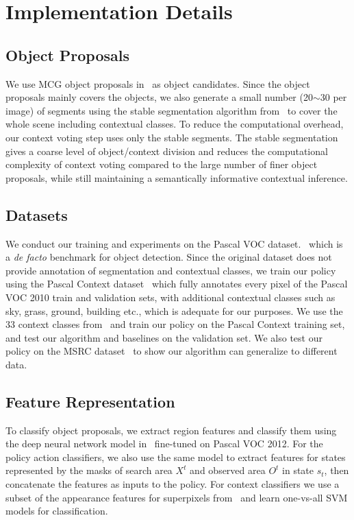 \section{Implementation Details}
\subsection{Object Proposals}
We use MCG object proposals in~\cite{arbelaez2014multiscale} as object candidates. Since the object proposals mainly covers the objects,  we also generate a small number (20$\sim$30 per image) of segments using the stable segmentation algorithm from~\cite{chen2011piecing} to cover the whole scene including contextual classes. To reduce the computational overhead, our context voting step uses only the stable segments. The stable segmentation gives a coarse level of object/context division and reduces the computational complexity of context voting compared to the large number of finer object proposals, while still maintaining a semantically informative contextual inference. 

\subsection{Datasets}
We conduct our training and experiments on the Pascal VOC dataset.~\cite{Everingham10} which is a \textit{de facto} benchmark for object detection. Since the original dataset does not provide annotation of segmentation and contextual classes, we train our policy using the Pascal Context dataset~\cite{mottaghi2014role} which fully annotates every pixel of the Pascal VOC 2010 train and validation sets, with additional contextual classes such as sky, grass, ground, building etc., which is adequate for our purposes. We use the 33 context classes from~\cite{mottaghi2014role} and train our policy on the Pascal Context training set, and test our algorithm and baselines on the validation set. We also test our policy on the MSRC dataset~\cite{shotton2006textonboost} to show our algorithm can generalize to different data. 

\subsection{Feature Representation}
To classify object proposals, we extract region features and classify them using the deep neural network model in~\cite{BharathECCV2014} fine-tuned on Pascal VOC 2012. For the policy action classifiers, we also use the same model to extract features for states represented by the masks of search area $X^t$ and observed area $O^t$ in state $s_t$, then concatenate the features as inputs to the policy. For context classifiers we use a subset of the appearance features for superpixels from~\cite{tighe2010superparsing} and learn one-vs-all SVM models for classification.

